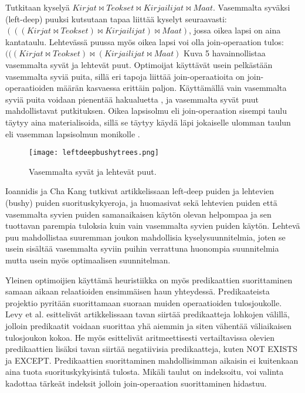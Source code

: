 \documentclass[finnish]{tktltiki2}
\theoremstyle{definition}
\theoremstyle{remark}
\begin{document}
Tutkitaan kyselyä $Kirjat \Join Teokset \Join Kirjailijat \Join Maat$. Vasemmalta syväksi (left-deep) puuksi kutsutaan tapaa liittää kyselyt seuraavasti: $(((Kirjat \Join Teokset) \Join Kirjailijat) \Join Maat)$, jossa oikea lapsi on aina kantataulu. Lehtevässä puussa myös oikea lapsi voi olla join-operaation tulos: $(((Kirjat \Join Teokset) \Join (Kirjailijat \Join Maat)$ Kuva 5 havainnollistaa vasemmalta syvät ja lehtevät puut. Optimoijat käyttävät usein pelkästään vasemmalta syviä puita, sillä eri tapoja liittää join-operaatioita on join-operaatioiden määrän kasvaessa erittäin paljon. Käyttämällä vain vasemmalta syviä puita voidaan pienentää hakualuetta \cite{ioannidis1991left}, ja vasemmalta syvät puut mahdollistavat putkituksen. Oikea lapsisolmu eli join-operaation sisempi taulu täytyy aina materialisoida, sillä se täytyy käydä läpi jokaiselle ulomman taulun eli vasemman lapsisolmun monikolle \cite{ramakrishnan2003database}. 

\begin{figure}[!h]
  \caption{Vasemmalta syvät ja lehtevät puut.}
  \centering
    \texttt{[image: leftdeepbushytrees.png]}
\end{figure}

Ioannidis ja Cha Kang tutkivat artikkelissaan \cite{ioannidis1991left} left-deep puiden ja lehtevien (bushy) puiden suorituskykyeroja, ja huomasivat sekä lehtevien puiden että vasemmalta syvien puiden samanaikaisen käytön olevan helpompaa ja sen tuottavan parempia tuloksia kuin vain vasemmalta syvien puiden käytön. Lehtevä puu mahdollistaa suuremman joukon mahdollisia kyselysuunnitelmia, joten se usein sisältää vasemmalta syviin puihin verrattuna huonompia suunnitelmia mutta usein myös optimaalisen suunnitelman.

Yleinen optimoijien käyttämä heuristiikka on myös predikaattien suorittaminen samaan aikaan relaatioiden ensimmäisen haun yhteydessä. Predikaateista projektio pyritään suorittamaan suoraan muiden operaatioiden tulosjoukolle. Levy et al. esittelivät artikkelissaan \cite{levy1994query} tavan siirtää predikaatteja lohkojen välillä, jolloin predikaatit voidaan suorittaa yhä aiemmin ja siten vähentää väliaikaisen tulosjoukon kokoa. He myös esittelivät aritmeettisesti vertailtavissa olevien predikaattien lisäksi tavan siirtää negatiivisia predikaatteja, kuten NOT EXISTS ja EXCEPT. Predikaattien suorittaminen mahdollisimman aikaisin ei kuitenkaan aina tuota suorituskykyisintä tulosta. \cite{ramakrishnan2003database} Mikäli taulut on indeksoitu, voi valinta kadottaa tärkeät indeksit jolloin join-operaation suorittaminen hidastuu.
\end{document}
